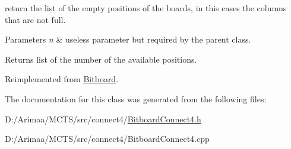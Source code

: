 return the list of the empty positions of the boards, in this cases the columns that are not full. 


\begin{DoxyParams}{Parameters}
{\em n} & useless parameter but required by the parent class. \\
\hline
\end{DoxyParams}
\begin{DoxyReturn}{Returns}
list of the number of the available positions. 
\end{DoxyReturn}


Reimplemented from \hyperlink{class_bitboard_add99aaac08d1926daf8836165cbba82e}{Bitboard}.



The documentation for this class was generated from the following files\+:\begin{DoxyCompactItemize}
\item 
D\+:/\+Arimaa/\+M\+C\+T\+S/src/connect4/\hyperlink{_bitboard_connect4_8h}{Bitboard\+Connect4.\+h}\item 
D\+:/\+Arimaa/\+M\+C\+T\+S/src/connect4/Bitboard\+Connect4.\+cpp\end{DoxyCompactItemize}

